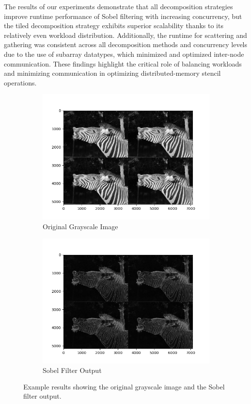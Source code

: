 The results of our experiments demonstrate that all decomposition strategies improve runtime performance of Sobel filtering with increasing concurrency, but the tiled decomposition strategy exhibits superior scalability thanks to its relatively even workload distribution. Additionally, the runtime for scattering and gathering was consistent across all decomposition methods and concurrency levels due to the use of subarray datatypes, which minimized and optimized inter-node communication. These findings highlight the critical role of balancing workloads and minimizing communication in optimizing distributed-memory stencil operations.

\begin{figure}[h]
    \centering
    \begin{subfigure}{0.45\textwidth}
        \centering
        \includegraphics[width=\textwidth]{images/grayscale.png}
        \caption{Original Grayscale Image}
        \label{fig:grayscale}
    \end{subfigure}
    \hfill
    \begin{subfigure}{0.45\textwidth}
        \centering
        \includegraphics[width=\textwidth]{images/sobel_output.png}
        \caption{Sobel Filter Output}
        \label{fig:sobel-output}
    \end{subfigure}
    \caption{Example results showing the original grayscale image and the Sobel filter output.}
    \label{fig:example-results}
\end{figure}